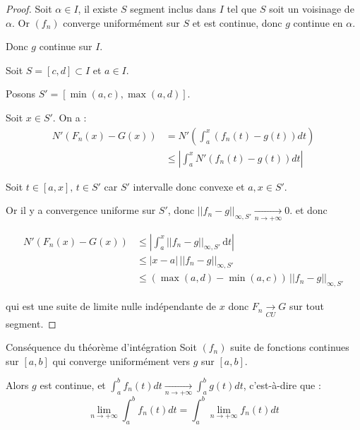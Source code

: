 \begin{proof}
    Soit $\alpha \in I$, il existe $S$ segment inclus dans $I$ tel que $S$ soit un voisinage de $\alpha$. Or 
    $(f_n)$ converge uniformément sur $S$ et est continue, donc $g$ continue en $\alpha$. 

    Donc $g$ continue sur $I$.

    \lvspace Soit $S = [c, d] \subset I$ et $a \in I$. 
    
    Posons $S' = [\min(a, c), \max(a, d)]$.

    Soit $x \in S'$. On a :
    \begin{align}
        N'(F_n(x) - G(x)) & = N'\left( \int_a^x (f_n(t) - g(t)) dt \right) \\
        & \leqslant \left| \int_{a}^x N'(f_n(t) - g(t)) dt \right|
    \end{align}

    Soit $t \in [a, x], \, t \in S'$ car $S'$ intervalle donc convexe et $a, x \in S'$. 

    Or il y a convergence uniforme sur $S'$, donc $||f_n - g||_{\infty, S'} \xrightarrow[n\to +\infty]{} 0$.
    et donc 

    \begin{equation*}
    \begin{aligned}
        N'(F_n(x) - G(x)) & \leqslant \left| \int_{a}^{x} ||f_n - g||_{\infty, S'} \,\mathrm{d}t \right| \\
        & \leqslant |x - a| \, ||f_n - g||_{\infty, S'} \\
        & \leqslant (\max(a, d) - \min(a, c)) \, ||f_n - g||_{\infty, S'}
    \end{aligned}
    \end{equation*}

    qui est une suite de limite nulle indépendante de $x$ donc $F_n \xrightarrow[CU]{} G$ sur tout segment. 
\end{proof}

\begin{corollaire}{Conséquence du théorème d'intégration}{}
    Soit $(f_n)$ suite de fonctions continues sur 
    $[a, b]$ qui converge uniformément vers $g$ sur $[a, b]$. 
    
    Alors $g$ est continue, et
    $\displaystyle \int_a^b f_n(t) dt \xrightarrow[n\to +\infty]{} \int_a^b g(t) dt$, c'est-à-dire
    que : \[\lim_{n \to +\infty} \int_a^b f_n(t) dt = \int_a^b \lim_{n \to +\infty} f_n(t) dt\]
\end{corollaire}

